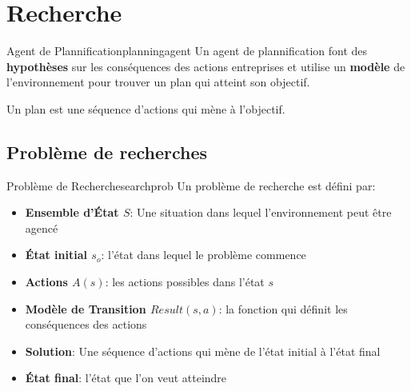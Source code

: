 \documentclass[a4paper, 12pt]{extarticle}
\begin{document}
\section{Recherche} %
\label{sec:recherche}

\begin{definition}{Agent de Plannification}{planningagent}
    Un agent de plannification font des \textbf{hypothèses} sur les conséquences des actions entreprises
    et utilise un \textbf{modèle} de l'environnement pour trouver un plan qui atteint son objectif.
\end{definition}

\begin{note}
    Un plan est une séquence d'actions qui mène à l'objectif.
\end{note}

\subsection{Problème de recherches} %
\label{sub:probleme_de_recherches}

\begin{definition}{Problème de Recherche}{searchprob}
    Un problème de recherche est défini par:
    \begin{itemize}
        \item \textbf{Ensemble d'État $S$}: Une situation dans lequel l'environnement peut être agencé
        \item \textbf{État initial $s_o$}: l'état dans lequel le problème commence
        \item \textbf{Actions $A(s)$}: les actions possibles dans l'état $s$
        \item \textbf{Modèle de Transition $Result(s, a)$}: la fonction qui définit les conséquences des actions
        \item \textbf{Solution}: Une séquence d'actions qui mène de l'état initial à l'état final
        \item \textbf{État final}: l'état que l'on veut atteindre
    \end{itemize}
\end{definition}

\end{document}
